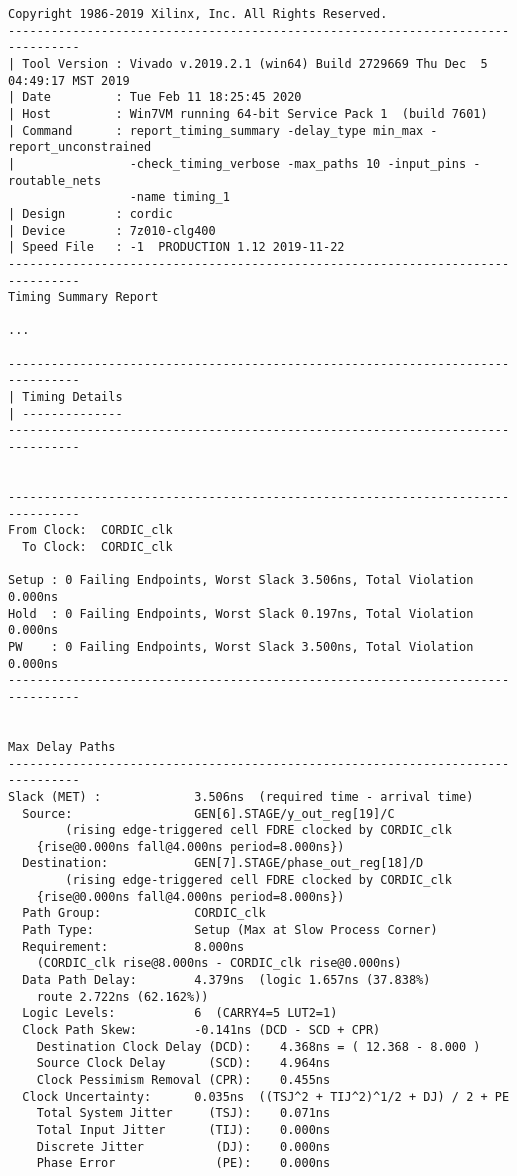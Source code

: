 \begin{Verbatim}[fontsize=\footnotesize,xleftmargin=-3.6cm]
Copyright 1986-2019 Xilinx, Inc. All Rights Reserved.
--------------------------------------------------------------------------------
| Tool Version : Vivado v.2019.2.1 (win64) Build 2729669 Thu Dec  5 04:49:17 MST 2019
| Date         : Tue Feb 11 18:25:45 2020
| Host         : Win7VM running 64-bit Service Pack 1  (build 7601)
| Command      : report_timing_summary -delay_type min_max -report_unconstrained
|                -check_timing_verbose -max_paths 10 -input_pins -routable_nets
                 -name timing_1
| Design       : cordic
| Device       : 7z010-clg400
| Speed File   : -1  PRODUCTION 1.12 2019-11-22
--------------------------------------------------------------------------------
Timing Summary Report

...

--------------------------------------------------------------------------------
| Timing Details
| --------------
--------------------------------------------------------------------------------


--------------------------------------------------------------------------------
From Clock:  CORDIC_clk
  To Clock:  CORDIC_clk

Setup : 0 Failing Endpoints, Worst Slack 3.506ns, Total Violation 0.000ns
Hold  : 0 Failing Endpoints, Worst Slack 0.197ns, Total Violation 0.000ns
PW    : 0 Failing Endpoints, Worst Slack 3.500ns, Total Violation 0.000ns
--------------------------------------------------------------------------------


Max Delay Paths
--------------------------------------------------------------------------------
Slack (MET) :             3.506ns  (required time - arrival time)
  Source:                 GEN[6].STAGE/y_out_reg[19]/C
        (rising edge-triggered cell FDRE clocked by CORDIC_clk 
	{rise@0.000ns fall@4.000ns period=8.000ns})
  Destination:            GEN[7].STAGE/phase_out_reg[18]/D
        (rising edge-triggered cell FDRE clocked by CORDIC_clk 
	{rise@0.000ns fall@4.000ns period=8.000ns})
  Path Group:             CORDIC_clk
  Path Type:              Setup (Max at Slow Process Corner)
  Requirement:            8.000ns 
  	(CORDIC_clk rise@8.000ns - CORDIC_clk rise@0.000ns)
  Data Path Delay:        4.379ns  (logic 1.657ns (37.838%)
  	route 2.722ns (62.162%))
  Logic Levels:           6  (CARRY4=5 LUT2=1)
  Clock Path Skew:        -0.141ns (DCD - SCD + CPR)
    Destination Clock Delay (DCD):    4.368ns = ( 12.368 - 8.000 )
    Source Clock Delay      (SCD):    4.964ns
    Clock Pessimism Removal (CPR):    0.455ns
  Clock Uncertainty:      0.035ns  ((TSJ^2 + TIJ^2)^1/2 + DJ) / 2 + PE
    Total System Jitter     (TSJ):    0.071ns
    Total Input Jitter      (TIJ):    0.000ns
    Discrete Jitter          (DJ):    0.000ns
    Phase Error              (PE):    0.000ns


\end{Verbatim}
